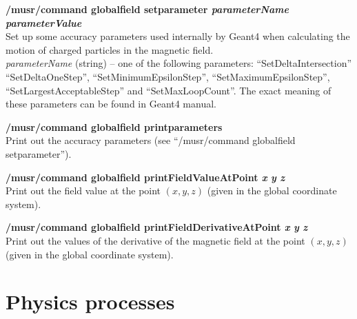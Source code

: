 \documentclass[twoside]{dis04}
\begin{document}
\begin{description}
\item{\bf /musr/command globalfield setparameter \emph{parameterName} \emph{parameterValue} }\\
	Set up some accuracy parameters used internally by Geant4 when calculating the motion
	of charged particles in the magnetic field.\\
	\emph{parameterName} (string) -- one of the following parameters: ``SetDeltaIntersection''
	``SetDeltaOneStep'', ``SetMinimumEpsilonStep'', ``SetMaximumEpsilonStep'',
	``SetLargestAcceptableStep'' and ``SetMaxLoopCount''.  The exact meaning of
	these parameters can be found in Geant4 manual.

\item{\bf /musr/command globalfield printparameters} \\
	Print out the accuracy parameters (see ``/musr/command globalfield setparameter'').

\item{\bf /musr/command globalfield printFieldValueAtPoint \emph{x} \emph{y} \emph{z}} \\
	Print out the field value at the point $(x, y, z)$ (given in the global 
	coordinate system).

\item{\bf /musr/command globalfield printFieldDerivativeAtPoint \emph{x} \emph{y} \emph{z}} \\
	Print out the values of the derivative of the magnetic field at the point $(x, y, z)$ 
        (given in the global coordinate system).  
\end{description}

\section{Physics processes}
\end{document}
